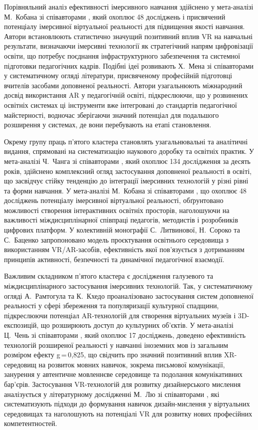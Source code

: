 Порівняльний аналіз ефективності імерсивного навчання здійснено у мета-аналізі М.~Кобана зі співавторами \cite{Lytvynova2023Comparative}, який охоплює 48 досліджень і присвячений потенціалу імерсивної віртуальної реальності для підвищення якості навчання. Автори встановлюють статистично значущий позитивний вплив VR на навчальні результати, визначаючи імерсивні технології як стратегічний напрям цифровізації освіти, що потребує поєднання інфраструктурного забезпечення та системної підготовки педагогічних кадрів. Подібні ідеї розвивають Х.~Мена зі співавторами \cite{Shevchuk2024Readiness} у систематичному огляді літератури, присвяченому професійній підготовці вчителів засобами доповненої реальності. Автори узагальнюють міжнародний досвід використання AR у педагогічній освіті, підкреслюючи, що у розвинених освітніх системах ці інструменти вже інтегровані до стандартів педагогічної майстерності, водночас зберігаючи значний потенціал для подальшого розширення у системах, де вони перебувають на етапі становлення.

Окрему групу праць п'ятого кластера становлять узагальнювальні та аналітичні видання, спрямовані на систематизацію наукового доробку та освітніх практик. У мета-аналізі Ч.~Чанга зі співавторами \cite{Lytvynova2023Health}, який охоплює 134 дослідження за десять років, здійснено комплексний огляд застосування доповненої реальності в освіті, що засвідчує стійку тенденцію до інтеграції імерсивних технологій у різні рівні та форми навчання. У мета-аналізі М.~Кобана зі співавторами \cite{Lytvynova2023Comparative}, що охоплює 48 досліджень потенціалу імерсивної віртуальної реальності, обґрунтовано можливості створення інтерактивних освітніх просторів, наголошуючи на важливості міждисциплінарної співпраці педагогів, методистів і розробників цифрових платформ. У колективній монографії С.~Литвинової, Н.~Сороко та С.~Баценко \cite{Lytvynova2023Model} запропоновано модель проєктування освітнього середовища з використанням VR/AR-засобів, ефективність якої пов'язується з дотриманням принципів активності, безпечності та динамічної педагогічної взаємодії.

Важливим складником п'ятого кластера є дослідження галузевого та міждисциплінарного застосування імерсивних технологій. Так, у систематичному огляді А.~Рамтогула та К.~Кхедо \cite{Granchak2023Heritage} проаналізовано застосування систем доповненої реальності у сфері збереження та популяризації культурної спадщини, підкреслюючи потенціал AR-технологій для створення віртуальних музеїв і 3D-експозицій, що розширюють доступ до культурних об'єктів. У мета-аналізі Ц.~Чень зі співавторами \cite{Boiko2024Immersive}, який охоплює 17 досліджень, доведено ефективність технологій розширеної реальності у навчанні іноземних мов із загальним розміром ефекту g\,=\,0{,}825, що свідчить про значний позитивний вплив XR-середовищ на розвиток мовних навичок, зокрема письмової комунікації, занурення у автентичне мовленнєве середовище та подолання комунікативних бар'єрів. Застосування VR-технологій для розвитку дизайнерського мислення аналізується у літературному дослідженні М.~Лю зі співавторами \cite{Gordeev2025Printing}, які систематизують підходи до формування навичок дизайн-мислення у віртуальних середовищах та наголошують на потенціалі VR для розвитку нових професійних компетентностей.

